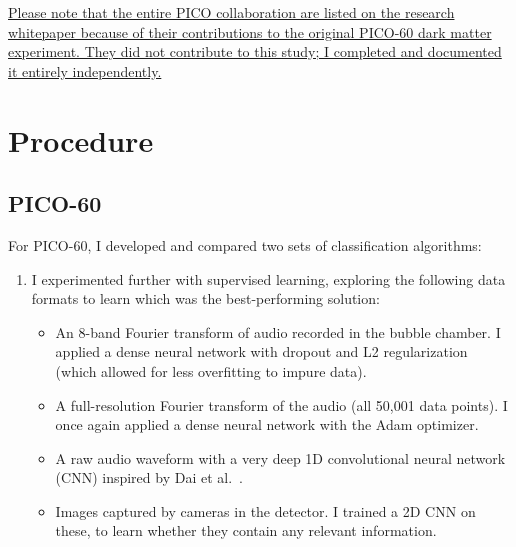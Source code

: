 \documentclass[12pt]{article}
\begin{document}
\ul{Please note that the entire PICO collaboration are listed on the research whitepaper because of their contributions to the original PICO-60 dark matter experiment. They did not contribute to this study; I completed and documented it entirely independently.}

\section{Procedure}

\subsection{PICO-60}

For PICO-60, I developed and compared two sets of classification algorithms:

\begin{enumerate}
    \item I experimented further with supervised learning, exploring the following data formats to learn which was the best-performing solution:
    \begin{itemize}
        \item An 8-band Fourier transform of audio recorded in the bubble chamber. I applied a dense neural network with dropout \cite{dropout} and L2 regularization (which allowed for less overfitting to impure data).
        \item A full-resolution Fourier transform of the audio (all 50,001 data points). I once again applied a dense neural network with the Adam \cite{adam} optimizer.
        \item A raw audio waveform with a very deep 1D convolutional neural network (CNN) inspired by Dai et al.\ \cite{verydeepconvnets}.
        \item Images captured by cameras in the detector. I trained a 2D CNN on these, to learn whether they contain any relevant information.
    \end{itemize}
    \begin{figure}[ht]
        \centering

\end{figure}
\end{enumerate}
\end{document}
